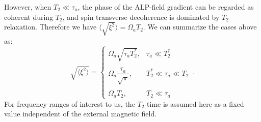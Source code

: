 \documentclass{WileyMSP-template}
\newcommand{\DB}[1]{\textcolor{blue}{#1}}
\newcommand{\DK}[1]{\textcolor{brown}{Derek: #1}}
\providecommand{\DIFaddtex}[1]{{\protect\color{blue}\uwave{#1}}} %
\providecommand{\DIFdeltex}[1]{{\protect\color{red}\sout{#1}}}                      %
\providecommand{\DIFaddbegin}{} %
\providecommand{\DIFaddend}{} %
\providecommand{\DIFdelbegin}{} %
\providecommand{\DIFdelend}{} %
\providecommand{\DIFadd}[1]{\texorpdfstring{\DIFaddtex{#1}}{#1}} %
\providecommand{\DIFdel}[1]{\texorpdfstring{\DIFdeltex{#1}}{}} %
\begin{document}
	However, when $T_2 \ll \tau_a$, the phase of the ALP-field gradient can be regarded as coherent during $T_2$, and spin transverse decoherence is dominated by $T_2$ relaxation. Therefore we have \DIFdelbegin \DIFdel{$\langle\sqrt{\xi^2}\rangle=\Omega_{a}T_2$}\DIFdelend \DIFaddbegin \DIFadd{$\sqrt{\langle \xi^2\rangle}=\Omega_{a}T_2$}\DIFaddend . 
	We can summarize the cases above as: 
	\begin{equation}
		\sqrt{\langle \xi^2\rangle}  = \left\{
		\begin{array}{cl}
			\Omega_{a}\sqrt{\tau_a T_2^*} ,
			&  \tau_a \ll T_2^*\\
			& \\
			\Omega_a\dfrac{\tau_a}{\sqrt{\pi}} ,
			&  T_2^*\ll\tau_a \ll T_2\\
			& \\
			\Omega_a T_2 ,
			&  T_2 \ll \tau_a
		\end{array} \right.
		\,.\label{eq:rms_xi}
	\end{equation}
	For frequency ranges of interest to us, 
	the $T_2$ time is assumed here as a fixed value independent of the external magnetic field. 
\end{document}
